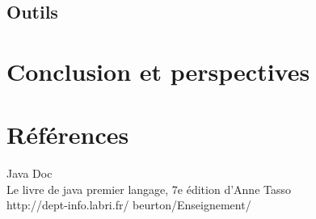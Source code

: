 \documentclass{report}
\begin{document}
\section{Outils}



\chapter*{Conclusion et perspectives}


\chapter*{Références}
Java Doc\\
Le livre de java premier langage, 7e édition d'Anne Tasso\\
http://dept-info.labri.fr/ beurton/Enseignement/\\
\end{document}
